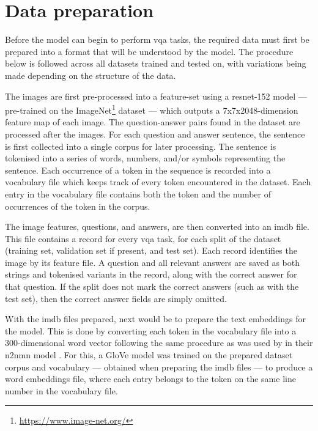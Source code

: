 \section{Data preparation}
\label{sec:data_preparation}

Before the model can begin to perform \gls{vqa} tasks, the required data must first be prepared into a format that will be understood by the model.
The procedure below is followed across all datasets trained and tested on, with variations being made depending on the structure of the data.

The images are first pre-processed into a feature-set using a \acrshort{resnet}-152 model \cite{he_deep_2015} --- pre-trained on the ImageNet\footnote{\url{https://www.image-net.org/}} dataset \cite{deng_imagenet_2009} --- which outputs a 7x7x2048-dimension feature map of each image.
The question-answer pairs found in the dataset are processed after the images.
For each question and answer sentence, the sentence is first collected into a single \gls{corpus} for later processing.
The sentence is tokenised into a series of words, numbers, and/or symbols representing the sentence.
Each occurrence of a token in the sequence is recorded into a vocabulary file which keeps track of every token encountered in the dataset.
Each entry in the vocabulary file contains both the token and the number of occurrences of the token in the \gls{corpus}.

The image features, questions, and answers, are then converted into an \gls{imdb} file.
This file contains a record for every \acrshort{vqa} task, for each split of the dataset (training set, validation set if present, and test set).
Each record identifies the image by its feature file.
A question and all relevant answers are saved as both strings and tokenised variants in the record, along with the correct answer for that question.
If the split does not mark the correct answers (such as with the test set), then the correct answer fields are simply omitted.

With the \gls{imdb} files prepared, next would be to prepare the text embeddings for the model.
This is done by converting each token in the vocabulary file into a 300-dimensional word vector following the same procedure as was used by \citeauthor{hu_learning_2017} in their \gls{n2nmn} model \cite{hu_learning_2017}.
For this, a GloVe model \cite{pennington_glove_2014} was trained on the prepared dataset \gls{corpus} and vocabulary --- obtained when preparing the \gls{imdb} files --- to produce a word embeddings file, where each entry belongs to the token on the same line number in the vocabulary file.

